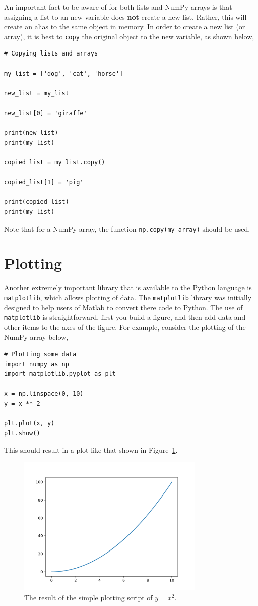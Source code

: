 \documentclass[a4paper]{article}
\begin{document}
An important fact to be aware of for both lists and NumPy arrays is that assigning a list to an new variable does \textbf{not} create a new list.
Rather, this will create an alias to the same object in memory.
In order to create a new list (or array), it is best to \texttt{copy} the original object to the new variable, as shown below,
\begin{lstlisting}
# Copying lists and arrays

my_list = ['dog', 'cat', 'horse']

new_list = my_list

new_list[0] = 'giraffe'

print(new_list)
print(my_list)

copied_list = my_list.copy()

copied_list[1] = 'pig'

print(copied_list)
print(my_list)
\end{lstlisting}
Note that for a NumPy array, the function \texttt{np.copy(my\_array)} should be used.

\section{Plotting}

Another extremely important library that is available to the Python language is \texttt{matplotlib}, which allows plotting of data.
The \texttt{matplotlib} library was initially designed to help users of Matlab to convert there code to Python.
The use of \texttt{matplotlib} is straightforward, first you build a figure, and then add data and other items to the axes of the figure.
For example, consider the plotting of the NumPy array below,
\begin{lstlisting}
# Plotting some data
import numpy as np
import matplotlib.pyplot as plt

x = np.linspace(0, 10)
y = x ** 2

plt.plot(x, y)
plt.show()
\end{lstlisting}
This should result in a plot like that shown in Figure~\ref{fig:x2}.
%
\begin{figure}[t]
\centering
\includegraphics[width=0.8\textwidth]{x_squared}
\caption{\label{fig:x2} The result of the simple plotting script of $y = x ^ 2$.}
\end{figure}
%
\end{document}

